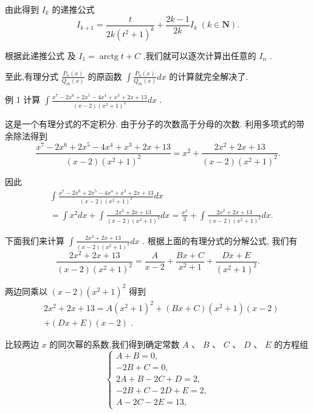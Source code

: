 由此得到 ${I}_{k}$ 的递推公式
$${I}_{k + 1} = \frac{t}{{2k}{\left( {t}^{2} + 1\right) }^{k}} + \frac{{2k} - 1}{2k}{I}_{k}\;\left( {k \in  \mathbf{N}}\right) .$$

根据此递推公式 及 ${I}_{1} = \operatorname{arctg}t + C$ ,我们就可以逐次计算出任意的 ${I}_{n}$ .

至此,有理分式 $\frac{{P}_{n}\left( x\right) }{{Q}_{m}\left( x\right) }$ 的原函数 $\int \frac{{P}_{n}\left( x\right) }{{Q}_{m}\left( x\right) }{dx}$ 的计算就完全解决了.

例 1 计算 $\int \frac{{x}^{7} - 2{x}^{6} + 2{x}^{5} - 4{x}^{4} + {x}^{3} + {2x} + {13}}{\left( {x - 2}\right) {\left( {x}^{2} + 1\right) }^{2}}{dx}$ .

这是一个有理分式的不定积分. 由于分子的次数高于分母的次数. 利用多项式的带余除法得到
$$\frac{{x}^{7} - 2{x}^{6} + 2{x}^{5} - 4{x}^{4} + {x}^{3} + {2x} + {13}}{\left( {x - 2}\right) {\left( {x}^{2} + 1\right) }^{2}} = {x}^{2} + \frac{2{x}^{2} + {2x} + {13}}{\left( {x - 2}\right) {\left( {x}^{2} + 1\right) }^{2}}.$$

因此
\begin{align*}
	&\int \frac{{x}^{7} - 2{x}^{6} + 2{x}^{5} - 4{x}^{4} + {x}^{3} + {2x} + {13}}{\left( {x - 2}\right) {\left( {x}^{2} + 1\right) }^{2}}{dx}\\
	&= \int {x}^{2}{dx} + \int \frac{2{x}^{2} + {2x} + {13}}{\left( {x - 2}\right) {\left( {x}^{2} + 1\right) }^{2}}{dx} = \frac{{x}^{3}}{3} + \int \frac{2{x}^{2} + {2x} + {13}}{\left( {x - 2}\right) {\left( {x}^{2} + 1\right) }^{2}}{dx}.
\end{align*}

下面我们来计算 $\int \frac{2{x}^{2} + {2x} + {13}}{\left( {x - 2}\right) {\left( {x}^{2} + 1\right) }^{2}}{dx}$ . 根据上面的有理分式的分解公式, 我们有
$$\frac{2{x}^{2} + {2x} + {13}}{\left( {x - 2}\right) {\left( {x}^{2} + 1\right) }^{2}} = \frac{A}{x - 2} + \frac{{Bx} + C}{{x}^{2} + 1} + \frac{{Dx} + E}{{\left( {x}^{2} + 1\right) }^{2}}.$$

两边同乘以 $\left( {x - 2}\right) {\left( {x}^{2} + 1\right) }^{2}$ 得到
\begin{align*}
	&2{x}^{2} + {2x} + {13} = A{\left( {x}^{2} + 1\right) }^{2} + \left( {{Bx} + C}\right) \left( {{x}^{2} + 1}\right) \left( {x - 2}\right)\\
	&+ \left( {{Dx} + E}\right) \left( {x - 2}\right) \text{ . }
\end{align*}

比较两边 $x$ 的同次幂的系数,我们得到确定常数 $A\text{ 、 }B\text{ 、 }C\text{ 、 }D\text{ 、 }E$ 的方程组
$$\left\{  \begin{array}{l} A + B = 0, \\   - {2B} + C = 0, \\  {2A} + B - {2C} + D = 2, \\   - {2B} + C - {2D} + E = 2, \\  A - {2C} - {2E} = {13}, \end{array}\right.$$

